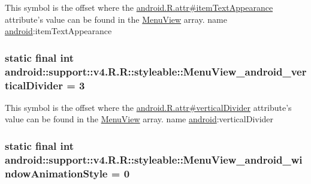 This symbol is the offset where the \hyperlink{}{android.R.attr\#itemTextAppearance} attribute's value can be found in the \hyperlink{classandroid_1_1support_1_1v4_1_1_r_1_1styleable_f27b70b4d764f1a1f59531c58e843a3b}{MenuView} array.  name \hyperlink{namespaceandroid}{android}:itemTextAppearance \hypertarget{classandroid_1_1support_1_1v4_1_1_r_1_1styleable_463a5ddae67100490816566a6e87082b}{
\subsubsection[{MenuView\_\-android\_\-verticalDivider}]{\setlength{\rightskip}{0pt plus 5cm}static final int android::support::v4.R.R::styleable::MenuView\_\-android\_\-verticalDivider = 3}}
\label{classandroid_1_1support_1_1v4_1_1_r_1_1styleable_463a5ddae67100490816566a6e87082b}


This symbol is the offset where the \hyperlink{}{android.R.attr\#verticalDivider} attribute's value can be found in the \hyperlink{classandroid_1_1support_1_1v4_1_1_r_1_1styleable_f27b70b4d764f1a1f59531c58e843a3b}{MenuView} array.  name \hyperlink{namespaceandroid}{android}:verticalDivider \hypertarget{classandroid_1_1support_1_1v4_1_1_r_1_1styleable_2235933d1e99168194dc75356546ce5f}{
\subsubsection[{MenuView\_\-android\_\-windowAnimationStyle}]{\setlength{\rightskip}{0pt plus 5cm}static final int android::support::v4.R.R::styleable::MenuView\_\-android\_\-windowAnimationStyle = 0}}
\label{classandroid_1_1support_1_1v4_1_1_r_1_1styleable_2235933d1e99168194dc75356546ce5f}


